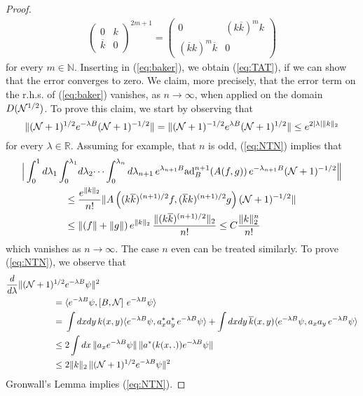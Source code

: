 \documentclass[11pt,a4paper]{article}
\newcommand{\bR}{{\mathbb R}}
\newcommand{\bN}{{\mathbb N}}
\newcommand{\cN}{{\cal N}}
\begin{document}
\begin{proof}
\[\begin{split}
\left(  \begin{array}{ll} 0 &  k  \\ \overline{k} & 0 \end{array} \right)^{2m+1} = \left(  \begin{array}{ll} 0 & (k \overline{k})^m k \\  (\overline{k} k)^m \overline{k} & 0 \end{array} \right) 
\end{split} \]
for every $m \in \bN$. Inserting in (\ref{eq:baker}), we obtain (\ref{eq:TAT}), if we can show that 
the error converges to zero. We claim, more precisely, that the error term on the r.h.s. of (\ref{eq:baker}) vanishes, as $n \to \infty$, when applied on the domain $D(\cN^{1/2})$. 
To prove this claim, we start by observing that
\begin{equation}\label{eq:NTN} \| (\cN+1)^{1/2} e^{-\lambda B} (\cN+1)^{-1/2} \| = \| (\cN+1)^{-1/2} e^{\lambda B} (\cN+1)^{1/2} \| \leq e^{2 |\lambda| \| k \|_2} \end{equation}
for every $\lambda \in \bR$. Assuming for example, that $n$ is odd, (\ref{eq:NTN}) implies that 
\[ \begin{split} \Big| \int_0^1 d\lambda_1 \int_0^{\lambda_1} &d\lambda_2 \dots \int_0^{\lambda_{n}} d\lambda_{n+1} \, e^{\lambda_{n+1} B}  \text{ad}_B^{n+1} (A (f,g)) \, e^{-\lambda_{n+1} B} (\cN +1)^{-1/2} \Big\| \\ \leq \; & \frac{e^{\| k \|_2}}{n!}  \| A \left( (k\overline{k})^{(n+1)/2} f , (\overline{k} k)^{(n+1)/2} g \right) (\cN+1)^{-1/2} \| \\
\leq \; & \| (f \| + \| g \|) \, e^{\| k \|_2} \, \frac{\| (k\overline{k})^{(n+1)/2} \|_2}{n!} \leq C \frac{\| k \|_2^n}{n!} 
\end{split}\]
which vanishes as $n \to \infty$. The case $n$ even can be treated similarly. To prove (\ref{eq:NTN}), we observe that 
\[ \begin{split} \frac{d}{d\lambda} \| (\cN+1)^{1/2} & e^{-\lambda B} \psi \|^2  \\ =\; & \langle e^{-\lambda B} \psi, \left[ B , \cN \right] \, e^{-\lambda B} \psi \rangle \\ = \; & \int dx dy \,  k(x,y) \langle e^{-\lambda B} \psi, a_x^* a_y^* \, e^{-\lambda B} \psi \rangle + \int dx dy \, \overline{k} (x,y) \langle e^{-\lambda B} \psi, a_x a_y \, e^{-\lambda B} \psi \rangle \\ 
\leq \; & 2\int dx \, \| a_x e^{-\lambda B} \psi \| \, \| a^* (k(x,.)) e^{-\lambda B} \psi \| \\ 
\leq \; &2 \| k \|_2 \,  \| (\cN+1)^{1/2} e^{-\lambda B} \psi \|^2
\end{split} \]
Gronwall's Lemma implies (\ref{eq:NTN}).   


\end{proof}
\end{document}
